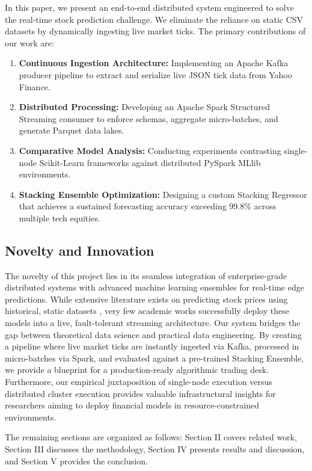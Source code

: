\documentclass[conference]{IEEEtran}
\begin{document}
In this paper, we present an end-to-end distributed system engineered to solve the real-time stock prediction challenge. We eliminate the reliance on static CSV datasets by dynamically ingesting live market ticks. The primary contributions of our work are:
\begin{enumerate}
    \item \textbf{Continuous Ingestion Architecture:} Implementing an Apache Kafka producer pipeline to extract and serialize live JSON tick data from Yahoo Finance.
    \item \textbf{Distributed Processing:} Developing an Apache Spark Structured Streaming consumer to enforce schemas, aggregate micro-batches, and generate Parquet data lakes.
    \item \textbf{Comparative Model Analysis:} Conducting experiments contrasting single-node Scikit-Learn frameworks against distributed PySpark MLlib environments.
    \item \textbf{Stacking Ensemble Optimization:} Designing a custom Stacking Regressor that achieves a sustained forecasting accuracy exceeding 99.8\% across multiple tech equities.
\end{enumerate}

\subsection{Novelty and Innovation}
The novelty of this project lies in its seamless integration of enterprise-grade distributed systems with advanced machine learning ensembles for real-time edge predictions. While extensive literature exists on predicting stock prices using historical, static datasets \cite{ref9, ref10}, very few academic works successfully deploy these models into a live, fault-tolerant streaming architecture. Our system bridges the gap between theoretical data science and practical data engineering. By creating a pipeline where live market ticks are instantly ingested via Kafka, processed in micro-batches via Spark, and evaluated against a pre-trained Stacking Ensemble, we provide a blueprint for a production-ready algorithmic trading desk. Furthermore, our empirical juxtaposition of single-node execution versus distributed cluster execution provides valuable infrastructural insights for researchers aiming to deploy financial models in resource-constrained environments.

The remaining sections are organized as follows: Section II covers related work, Section III discusses the methodology, Section IV presents results and discussion, and Section V provides the conclusion.
\end{document}
